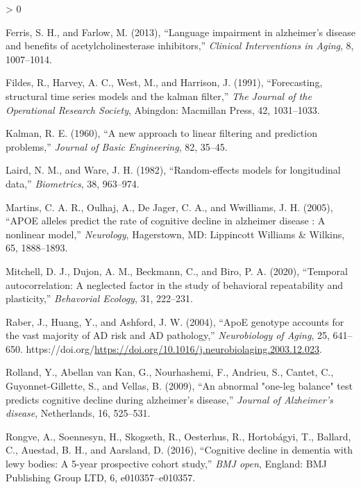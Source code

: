 \documentclass[
]{article}
\newlength{\cslhangindent}
\newenvironment{CSLReferences}[2] %
 {%
  \setlength{\parindent}{0pt}
  \ifodd #1 \everypar{\setlength{\hangindent}{\cslhangindent}}\ignorespaces\fi
  \ifnum #2 > 0
  \setlength{\parskip}{#2\baselineskip}
  \fi
 }%
 {}
\begin{document}
\begin{CSLReferences}{1}{0}
\leavevmode\hypertarget{ref-ADprogression}{}%
Ferris, S. H., and Farlow, M. (2013), {``Language impairment in alzheimer's disease and benefits of acetylcholinesterase inhibitors,''} \emph{Clinical Interventions in Aging}, 8, 1007--1014.

\leavevmode\hypertarget{ref-harvey_2009}{}%
Fildes, R., Harvey, A. C., West, M., and Harrison, J. (1991), {``Forecasting, structural time series models and the kalman filter,''} \emph{The Journal of the Operational Research Society}, Abingdon: Macmillan Press, 42, 1031--1033.

\leavevmode\hypertarget{ref-linFilt}{}%
Kalman, R. E. (1960), {``A new approach to linear filtering and prediction problems,''} \emph{Journal of Basic Engineering}, 82, 35--45.

\leavevmode\hypertarget{ref-randEff}{}%
Laird, N. M., and Ware, J. H. (1982), {``Random-effects models for longitudinal data,''} \emph{Biometrics}, 38, 963--974.

\leavevmode\hypertarget{ref-APOErateNLME}{}%
Martins, C. A. R., Oulhaj, A., De Jager, C. A., and Wwilliams, J. H. (2005), {``APOE alleles predict the rate of cognitive decline in alzheimer disease : A nonlinear model,''} \emph{Neurology}, Hagerstown, MD: Lippincott Williams \& Wilkins, 65, 1888--1893.

\leavevmode\hypertarget{ref-tempAuto}{}%
Mitchell, D. J., Dujon, A. M., Beckmann, C., and Biro, P. A. (2020), {``Temporal autocorrelation: A neglected factor in the study of behavioral repeatability and plasticity,''} \emph{Behavorial Ecology}, 31, 222--231.

\leavevmode\hypertarget{ref-RABER2004641}{}%
Raber, J., Huang, Y., and Ashford, J. W. (2004), {``ApoE genotype accounts for the vast majority of AD risk and AD pathology,''} \emph{Neurobiology of Aging}, 25, 641--650. https://doi.org/\url{https://doi.org/10.1016/j.neurobiolaging.2003.12.023}.

\leavevmode\hypertarget{ref-lmem2}{}%
Rolland, Y., Abellan van Kan, G., Nourhashemi, F., Andrieu, S., Cantet, C., Guyonnet-Gillette, S., and Vellas, B. (2009), {``An abnormal "one-leg balance" test predicts cognitive decline during alzheimer's disease,''} \emph{Journal of Alzheimer's disease}, Netherlands, 16, 525--531.

\leavevmode\hypertarget{ref-lewyBody}{}%
Rongve, A., Soennesyn, H., Skogseth, R., Oesterhus, R., Hortobágyi, T., Ballard, C., Auestad, B. H., and Aarsland, D. (2016), {``Cognitive decline in dementia with lewy bodies: A 5-year prospective cohort study,''} \emph{BMJ open}, England: BMJ Publishing Group LTD, 6, e010357--e010357.


\end{CSLReferences}
\end{document}
